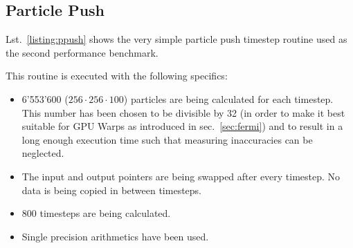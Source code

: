 \subsection{Particle Push} \label{sub:testParticlePush}

Lst.~\ref{listing:ppush} shows the very simple particle push timestep routine used as the second performance benchmark.

This routine is executed with the following specifics:
\begin{itemize}
 \item 6'553'600 ($256 \cdot 256 \cdot 100$) particles are being calculated for each timestep. This number has been chosen to be divisible by 32 (in order to make it best suitable for GPU Warps as introduced in sec.~\ref{sec:fermi}) and to result in a long enough execution time such that measuring inaccuracies can be neglected.
 \item The input and output pointers are being swapped after every timestep. No data is being copied in between timesteps.
 \item 800 timesteps are being calculated.
 \item Single precision arithmetics have been used.
\end{itemize}

